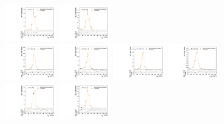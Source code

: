 \begin{figure}[htpb]
  \includegraphics[width=0.2\textwidth]{fig/analysisAppendix/templateVsReco_GbuToWW2000_r0_MJ_mu_HP_bb_HDy.pdf}
  \includegraphics[width=0.2\textwidth]{fig/analysisAppendix/templateVsReco_GbuToWW2000_r0_MJ_mu_LP_bb_HDy.pdf}\\
  \includegraphics[width=0.2\textwidth]{fig/analysisAppendix/templateVsReco_GbuToWW2000_r0_MJ_mu_HP_nobb_LDy.pdf}
  \includegraphics[width=0.2\textwidth]{fig/analysisAppendix/templateVsReco_GbuToWW2000_r0_MJ_mu_LP_nobb_LDy.pdf}
  \includegraphics[width=0.2\textwidth]{fig/analysisAppendix/templateVsReco_GbuToWW2000_r0_MJ_mu_HP_nobb_HDy.pdf}
  \includegraphics[width=0.2\textwidth]{fig/analysisAppendix/templateVsReco_GbuToWW2000_r0_MJ_mu_LP_nobb_HDy.pdf}\\
  \includegraphics[width=0.2\textwidth]{fig/analysisAppendix/templateVsReco_GbuToWW2000_r0_MJ_mu_HP_vbf_LDy.pdf}
  \includegraphics[width=0.2\textwidth]{fig/analysisAppendix/templateVsReco_GbuToWW2000_r0_MJ_mu_LP_vbf_LDy.pdf}

\end{figure}
